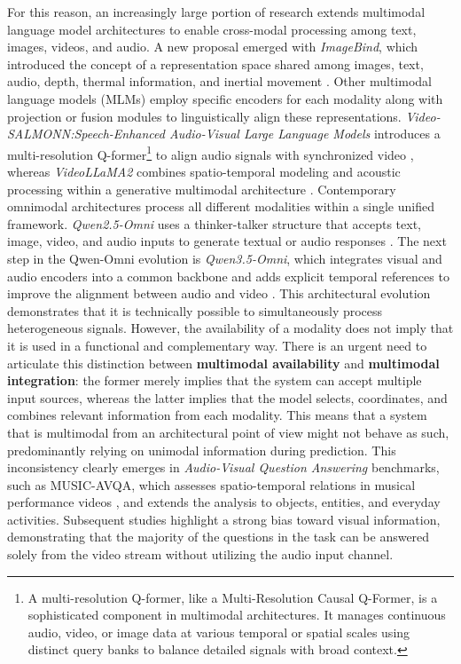 For this reason, an increasingly large portion of research extends multimodal language model architectures to enable cross-modal processing among text, images, videos, and audio. 
A new proposal emerged with \textit{ImageBind}, which introduced the concept of a representation space shared among images, text, audio, depth, thermal information, and inertial movement \cite{girdhar2023imagebind}.
Other multimodal language models (MLMs) employ specific encoders for each modality along with projection or fusion modules to linguistically align these representations. \textit{Video-SALMONN:Speech-Enhanced Audio-Visual Large Language Models} introduces a multi-resolution Q-former\footnote{A multi-resolution Q-former, like a Multi-Resolution Causal Q-Former, is a sophisticated component in multimodal architectures. It manages continuous audio, video, or image data at various temporal or spatial scales using distinct query banks to balance detailed signals with broad context.} to align audio signals with synchronized video \cite{sun2024videosalmonn}, whereas \textit{VideoLLaMA2} combines spatio-temporal modeling and acoustic processing within a generative multimodal architecture \cite{cheng2024videollama2}.
Contemporary omnimodal architectures process all different modalities within a single unified framework. \textit{Qwen2.5-Omni} uses a thinker-talker structure that accepts text, image, video, and audio inputs to generate textual or audio responses \cite{xu2025qwen25omni}. The next step in the Qwen-Omni evolution is \textit{Qwen3.5-Omni}, which integrates visual and audio encoders into a common backbone and adds explicit temporal references to improve the alignment between audio and video \cite{qwen2026qwen35omni}.
This architectural evolution demonstrates that it is technically possible to simultaneously process heterogeneous signals. However, the availability of a modality does not imply that it is used in a functional and complementary way.
There is an urgent need to articulate this distinction between \textbf{multimodal availability} and \textbf{multimodal integration}: the former merely implies that the system can accept multiple input sources, whereas the latter implies that the model selects, coordinates, and combines relevant information from each modality. This means that a system that is multimodal from an architectural point of view might not behave as such, predominantly relying on unimodal information during prediction.
This inconsistency clearly emerges in \textit{Audio-Visual Question Answering} benchmarks, such as MUSIC-AVQA, which assesses spatio-temporal relations in musical performance videos \cite{li2022musicavqa}, and extends the analysis to objects, entities, and everyday activities. Subsequent studies highlight a strong bias toward visual information, demonstrating that the majority of the questions in the task can be answered solely from the video stream without utilizing the audio input channel.

